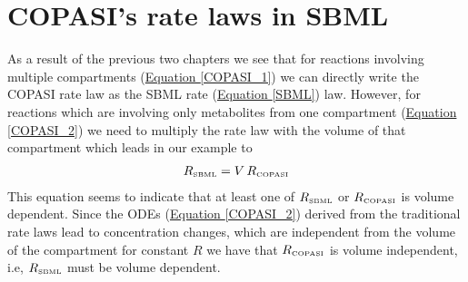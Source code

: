 \documentclass[12pt,english]{article}
\begin{document}
\section{COPASI's rate laws in SBML}
As a result of the previous two chapters we see that for reactions
involving multiple compartments (\hyperlink{COPASI_1}{Equation
\ref*{COPASI_1}}) we can directly write the COPASI rate law as the
SBML rate (\hyperlink{SBML}{Equation \ref*{SBML}}) law. However, for
reactions which are involving only metabolites from one compartment
(\hyperlink{COPASI_2}{Equation \ref*{COPASI_2}}) we need to multiply
the rate law with the volume of that compartment which leads in our
example to
%
\begin{eqnarray}
R_{\mbox{\tiny{SBML}}} = V \, R_{\mbox{\tiny{COPASI}}}
\end{eqnarray} 
%
This equation seems to indicate that at least one of
$R_{\mbox{\tiny{SBML}}}$ or $R_{\mbox{\tiny{COPASI}}}$ is volume
dependent. Since the ODEs (\hyperlink{COPASI_2}{Equation
\ref*{COPASI_2}}) derived from the traditional rate laws lead to
concentration changes, which are independent from the volume of the
compartment for constant $R$ we have that $R_{\mbox{\tiny{COPASI}}}$
is volume independent, i.e, $R_{\mbox{\tiny{SBML}}}$ must be volume
dependent.
\end{document}
